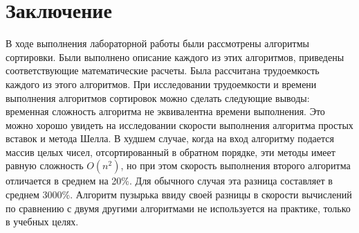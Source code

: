 \chapter*{Заключение}
В ходе выполнения лабораторной работы были рассмотрены алгоритмы сортировки. Были выполнено описание каждого из этих алгоритмов, приведены соответствующие математические расчеты. Была рассчитана трудоемкость каждого из этого алгоритмов. При исследовании трудоемкости и времени выполнения алгоритмов сортировок можно сделать следующие выводы: временная сложность алгоритма не эквивалентна времени выполнения. Это можно хорошо увидеть на исследовании скорости выполнения алгоритма простых вставок и метода Шелла. В худшем случае, когда на вход алгоритму подается массив целых чисел, отсортированный в обратном порядке, эти методы имеет равную сложность $O(n^2)$, но при этом скорость выполнения второго алгоритма отличается в среднем на 20\%. Для обычного случая эта разница составляет в среднем 3000\%. Алгоритм пузырька ввиду своей разницы в скорости вычислений по сравнению с двумя другими алгоритмами не используется на практике, только в учебных целях.
  